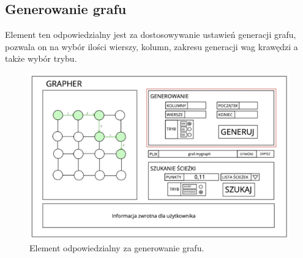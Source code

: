 \documentclass[10pt, a4paper]{report}
\begin{document}
    \subsection{Generowanie grafu}
    Element ten odpowiedzialny jest za dostosowywanie ustawień generacji grafu, pozwala on na wybór ilości wierszy, kolumn, zakresu generacji wag krawędzi a także wybór trybu.
    \begin{figure}[ht]
      \begin{center}
          \includegraphics[scale=0.19]{gui_gen.jpg}
          \caption{Element odpowiedzialny za generowanie grafu.}
      \end{center}
    \end{figure}
\end{document}
